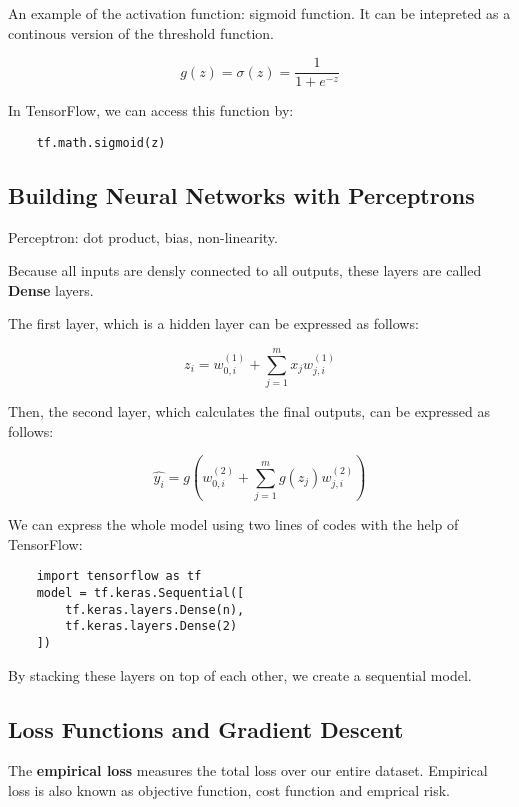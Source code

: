 \documentclass[12pt, a4paper, oneside]{article}
\begin{document}
An example of the activation function: sigmoid function. It can be intepreted as a continous version of the threshold function.

\begin{equation}
    g(z)=\sigma(z)=\frac{1}{1+e^{-z}}
\end{equation}

In TensorFlow, we can access this function by:

\begin{lstlisting}
    tf.math.sigmoid(z)
\end{lstlisting}

\subsection{Building Neural Networks with Perceptrons}

Perceptron: dot product, bias, non-linearity.

Because all inputs are densly connected to all outputs, these layers are called \textbf{Dense} layers.

The first layer, which is a hidden layer can be expressed as follows:

\begin{equation}
    z_{i}=w_{0,i}^{(1)}+\sum_{j=1}^{m}x_{j}w_{j,i}^{(1)}
\end{equation}

Then, the second layer, which calculates the final outputs, can be expressed as follows:

\begin{equation}
    \hat{y_{i}}=g(w_{0,i}^{(2)}+\sum_{j=1}^{m}g(z_{j})w_{j,i}^{(2)})
\end{equation}

We can express the whole model using two lines of codes with the help of TensorFlow:

\begin{lstlisting}
    import tensorflow as tf
    model = tf.keras.Sequential([
        tf.keras.layers.Dense(n),
        tf.keras.layers.Dense(2)
    ])
\end{lstlisting}

By stacking these layers on top of each other, we create a sequential model.

\subsection{Loss Functions and Gradient Descent}

The \textbf{empirical loss} measures the total loss over our entire dataset. Empirical loss is also known as objective function, cost function and emprical risk.
\end{document}

